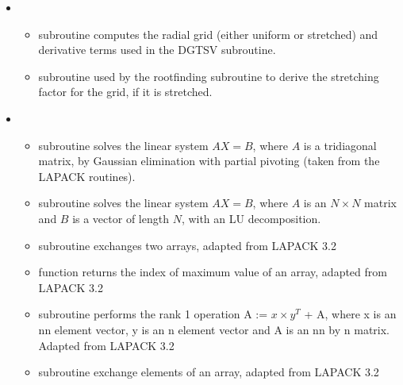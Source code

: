 \documentclass[letterpaper,10pt,english]{sphinxmanual}
\begin{document}
\begin{itemize}
\begin{itemize}
\end{itemize}

\item {} 
\sphinxAtStartPar
{}
\begin{itemize}
\item {} 
\sphinxAtStartPar
subroutine  \sphinxhyphen{} computes the radial grid (either uniform or stretched) and derivative terms used in the DGTSV subroutine.

\item {} 
\sphinxAtStartPar
subroutine  \sphinxhyphen{} used by the root\sphinxhyphen{}finding subroutine to derive the stretching factor for the grid, if it is stretched.


\end{itemize}

\item {} 
\sphinxAtStartPar
{}
\begin{itemize}
\item {} 
\sphinxAtStartPar
subroutine  \sphinxhyphen{} solves the linear system \(AX = B\), where \(A\) is a tridiagonal matrix, by
Gaussian elimination with partial pivoting (taken from the LAPACK routines).

\item {} 
\sphinxAtStartPar
subroutine  \sphinxhyphen{} solves the linear system \(AX = B\), where \(A\) is an \(N \times N\) matrix and \(B\) is a vector of length \(N\), with an LU decomposition.

\item {} 
\sphinxAtStartPar
subroutine  \sphinxhyphen{} exchanges two arrays, adapted from LAPACK 3.2

\item {} 
\sphinxAtStartPar
function  \sphinxhyphen{} returns the index of maximum value of an array, adapted from LAPACK 3.2

\item {} 
\sphinxAtStartPar
subroutine  \sphinxhyphen{} performs the rank 1 operation A := \(x \times y^T\) + A, where  x is an nn element vector, y is an n element vector and A is an nn by n matrix. Adapted from LAPACK 3.2

\item {} 
\sphinxAtStartPar
subroutine  \sphinxhyphen{} exchange elements of an array,  adapted from LAPACK 3.2


\end{itemize}
\end{itemize}
\end{document}
